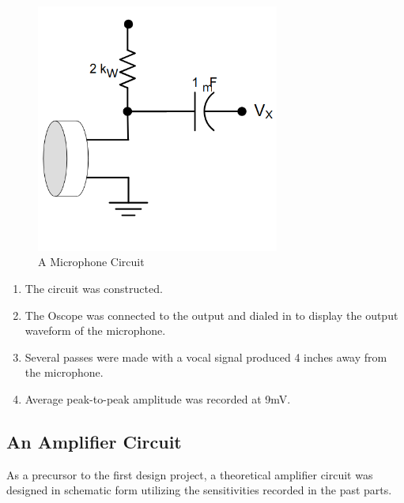\documentclass[12pt]{article}
\begin{document}
\begin{figure}[H]
	\centering
	\includegraphics[width=8cm]{04_08}
	\caption{A Microphone Circuit}
	\label{fig:mictest}
\end{figure}
\begin{enumerate}
	\item The circuit was constructed.
	\item The Oscope was connected to the output and dialed in to display the
	      output waveform of the microphone.
	\item Several passes were made with a vocal signal produced 4 inches away
	      from the microphone.
	\item Average peak-to-peak amplitude was recorded at 9mV.
\end{enumerate}
\subsection{An Amplifier Circuit}
As a precursor to the first design project, a theoretical amplifier circuit was
designed in schematic form utilizing the sensitivities recorded in the past
parts.
\end{document}
